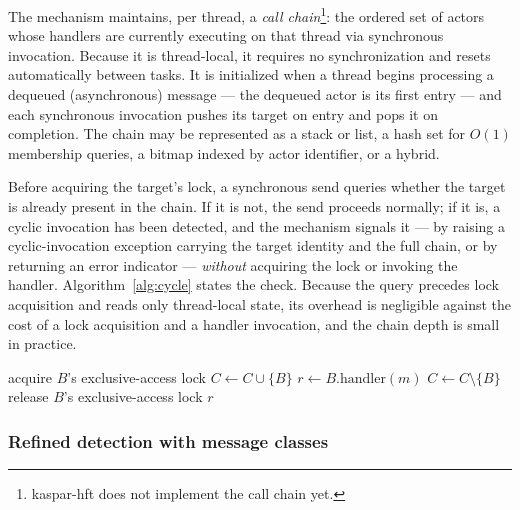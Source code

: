 \documentclass[11pt]{article}
\begin{document}
The mechanism maintains, per thread, a \emph{call chain}\footnote{kaspar-hft
does not implement the call chain yet.}: the ordered set of
actors whose handlers are currently executing on that thread via synchronous
invocation. Because it is thread-local, it requires no synchronization and resets
automatically between tasks. It is initialized when a thread begins processing a
dequeued (asynchronous) message --- the dequeued actor is its first entry --- and
each synchronous invocation pushes its target on entry and pops it on completion.
The chain may be represented as a stack or list, a hash set for $O(1)$ membership
queries, a bitmap indexed by actor identifier, or a hybrid.

Before acquiring the target's lock, a synchronous send queries whether the target
is already present in the chain. If it is not, the send proceeds normally; if it
is, a cyclic invocation has been detected, and the mechanism signals it --- by
raising a cyclic-invocation exception carrying the target identity and the full
chain, or by returning an error indicator --- \emph{without} acquiring the lock
or invoking the handler. Algorithm~\ref{alg:cycle} states the check. Because the
query precedes lock acquisition and reads only thread-local state, its overhead
is negligible against the cost of a lock acquisition and a handler invocation,
and the chain depth is small in practice.

\begin{algorithm}[t]
\caption{Synchronous send with cyclic-invocation detection}
\label{alg:cycle}
\DontPrintSemicolon
{}
\BlankLine
{}
\BlankLine
{}
acquire $B$'s exclusive-access lock\;
$C \gets C \cup \{B\}$\;
$r \gets B.\text{handler}(m)$ 
$C \gets C \setminus \{B\}$\;
release $B$'s exclusive-access lock\;
\Return $r$\;
\end{algorithm}

\subsubsection{Refined detection with message classes}
\end{document}
